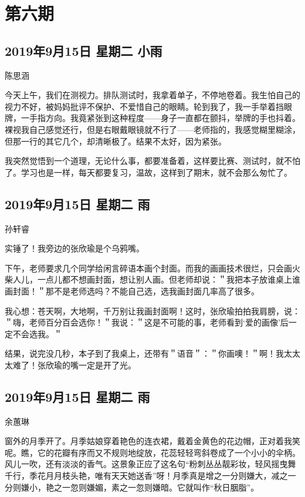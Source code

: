 \chapter{第六期}

\section{2019年9月15日 星期二 小雨}

陈思涵

今天上午，我们在测视力。排队测试时，我拿着单子，不停地卷着。我生怕自己的视力不好，被妈妈批评不保护、不爱惜自己的眼睛。轮到我了，我一手举着挡眼牌，一手指方向。我竟紧张到这种程度------身子一直都在颤抖，举牌的手也抖着。裸视我自己感觉还行，但是右眼戴眼镜就不行了------老师指的，我感觉糊里糊涂，但那一行的其它几个，却清晰极了。结果不太好，因为紧张。

我突然觉悟到一个道理，无论什么事，都要准备着，这样要比赛、测试时，就不怕了。学习也是一样，每天都要复习，温故，这样到了期末，就不会那么匆忙了。

\section{2019年9月15日 星期二 雨}

孙轩睿

实锤了！我旁边的张欣瑜是个乌鸦嘴。

下午，老师要求几个同学给闲言碎语本画个封面。而我的画画技术很烂，只会画火柴人儿，一点儿都不想画封面，想让别人画。但老师却说：＂我把本子放谁桌上谁画封面！＂那不是老师选吗？不能自己选，选我画封面几率高了很多。

我心想：苍天啊，大地啊，千万别让我画封面啊！这时，张欣瑜拍拍我肩膀，说：＂嗨，老师百分百会选你！＂我说：＂这是不可能的事，老师看到`爱的画像'后一定不会选我。＂

结果，说完没几秒，本子到了我桌上，还带有＂语音＂：＂你画噢！＂啊！我太太太难了！张欣瑜的嘴一定是开了光。

\section{2019年9月15日 星期二 雨}

余蕙琳

窗外的月季开了。月季姑娘穿着艳色的连衣裙，戴着金黄色的花边帽，正对着我笑呢。瞧，它的花瓣有序而又不规则地绽放，花蕊轻轻弯斜卷成了一个小小的伞柄。风儿一吹，还有淡淡的香气。这景象正应了这名句``粉刺丛丛靓彩妆，轻风摇曳舞千行，季花月月枝头艳，唯有天天她送香''呀！月季真是增之一分则嫌大，减之一分则嫌小，艳之一忽则嫌媚，素之一忽则嫌暗。它就叫作``秋日胭脂''。

